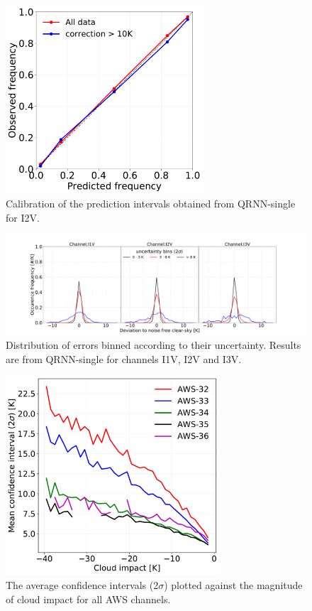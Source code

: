 \documentclass[amt, manuscript]{copernicus}
\begin{document}
\begin{figure}[t]
	\includegraphics[height = 70mm]{Figures/calibration_QRNN_I2V.pdf}	
	\caption{Calibration of the prediction intervals obtained from QRNN-single for I2V. }
	\label{fig:calibration_I1V}	
\end{figure}
\begin{figure}[t]
	\includegraphics[width=\textwidth]{Figures/PDF_uncertainty_bins_QRNN-single.pdf}	
	\caption{Distribution of errors binned according to their uncertainty. Results are from QRNN-single for channels I1V, I2V and I3V.}
	\label{fig:error_distribution_uncertainty_bins}	
\end{figure}
\begin{figure}[t]
	\includegraphics[width = 80mm]{Figures/cloud_impact_uncertainty_AWS.pdf}	
	\caption{The average confidence intervals (2$\sigma$) plotted against the magnitude of cloud impact for all AWS channels.}
	\label{fig:uncertainty_cloud_impact}	
\end{figure}
\end{document}
